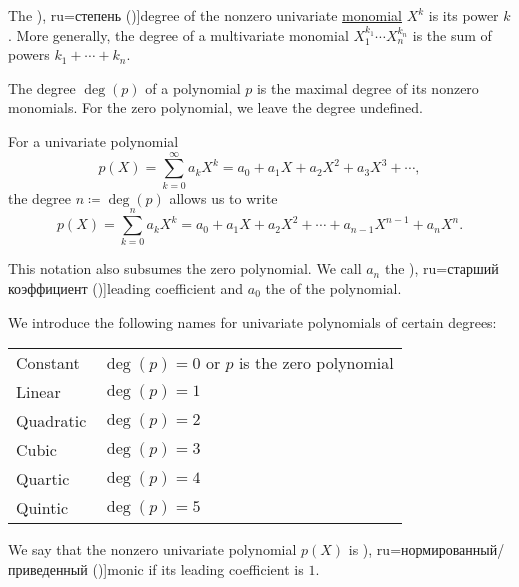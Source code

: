 \begin{definition}\label{def:polynomial_degree}
  The \term[bg=степен (\cite[22]{ГеновМиховскиМоллов1991}), ru=степень (\cite[sec. 11.3]{Тыртышников2007})]{degree} of the nonzero univariate \hyperref[def:polynomial_algebra]{monomial} \( X^k \) is its power \( k \). More generally, the degree of a multivariate monomial \( X_1^{k_1} \cdots X_n^{k_n} \) is the sum of powers \( k_1 + \cdots + k_n \).

  The degree \( \deg(p) \) of a polynomial \( p \) is the maximal degree of its nonzero monomials. For the zero polynomial, we leave the degree undefined.

  For a univariate polynomial
  \begin{equation*}
    p(X) = \sum_{k=0}^\infty a_k X^k = a_0 + a_1 X + a_2 X^2 + a_3 X^3 + \cdots,
  \end{equation*}
  the degree \( n \coloneqq \deg(p) \) allows us to write
  \begin{equation*}
    p(X) = \sum_{k=0}^n a_k X^k = a_0 + a_1 X + a_2 X^2 + \cdots + a_{n-1} X^{n-1} + a_n X^n.
  \end{equation*}

  This notation also subsumes the zero polynomial. We call \( a_n \) the \term[bg=старши коефициент (\cite[23]{ГеновМиховскиМоллов1991}), ru=старший коэффициент (\cite[93]{ГеновМиховскиМоллов1991})]{leading coefficient} and \( a_0 \) the  of the polynomial.

  We introduce the following names for univariate polynomials of certain degrees:
  \begin{center}
    \begin{tabular}{l | l}
      Constant  & \( \deg(p) = 0 \) or \( p \) is the zero polynomial \\
      Linear    & \( \deg(p) = 1 \)                                   \\
      Quadratic & \( \deg(p) = 2 \)                                   \\
      Cubic     & \( \deg(p) = 3 \)                                   \\
      Quartic   & \( \deg(p) = 4 \)                                   \\
      Quintic   & \( \deg(p) = 5 \)
    \end{tabular}
  \end{center}
\end{definition}

\begin{definition}\label{def:monic_polynomial}
  We say that the nonzero univariate polynomial \( p(X) \) is \term[bg=нормиран (\cite[29]{ГеновМиховскиМоллов1991}), ru=нормированный/приведенный (\cite[102]{Винберг2014})]{monic} if its leading coefficient is \( 1 \).
\end{definition}

